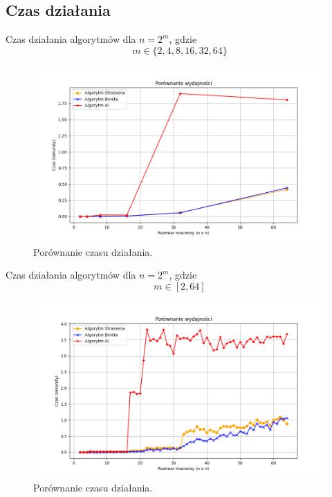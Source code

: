 \documentclass[11pt, leqno]{scrartcl}
\begin{document}
    \subsection{Czas działania}
    Czas działania algorytmów dla $n=2^m$, gdzie
    \[
        m \in \{2,4,8,16,32,64\}
    \]
    \begin{figure}[H]
        \centering
        \includegraphics[width=0.9\linewidth]{czas_dzialania1.png}
        \caption{Porównanie czasu działania.}
    \end{figure}
    Czas działania algorytmów dla $n=2^m$, gdzie
    \[
        m \in [2, 64]
    \]
    \begin{figure}[H]
        \centering
        \includegraphics[width=0.9\linewidth]{czas_dzialania2.png}
        \caption{Porównanie czasu działania.}
    \end{figure}
\end{document}
